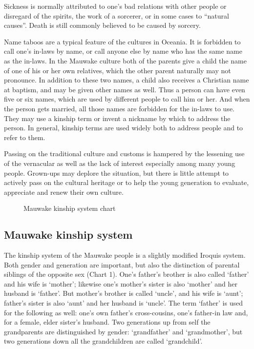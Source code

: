 Sickness is normally attributed to one's bad relations with other people or disregard of the spirits, the work of a sorcerer, or in some cases to ``natural causes''. Death is still commonly believed to be caused by sorcery.

Name taboos are a typical feature of the cultures in Oceania.  It is forbidden to call one's in-laws by name, or call anyone else by name who has the same name as the in-laws.  In the Mauwake culture both of the parents give a child the name of one of his or her own relatives, which the other parent naturally may not pronounce.  In addition to these two names, a child also receives a Christian name at baptism, and may be given other names as well.  Thus a person can have even five or six names, which are used by different people to call him or her.  And when the person gets married, all those names are forbidden for the in-laws to use.  They may use a kinship term or invent a nickname by which to address the person. In general, kinship terms are used widely both to address people and to refer to them.

Passing on the traditional culture and customs is hampered by the lessening use of the vernacular as well as the lack of interest especially among many young people. Grown-ups may deplore the situation, but there is little attempt to actively pass on the cultural heritage or to help the young generation to evaluate, appreciate and renew their own culture. 



\begin{figure}

\caption{Mauwake kinship system chart}
\label{fig:1:kinship}
\end{figure}
 



\subsection{Mauwake kinship system} \label{sec:1.3.6}
The kinship system of the Mauwake people is a slightly modified Iroquis system. Both gender and generation are important, but also the distinction of parental siblings of the opposite sex (Chart 1). One's father's brother is also called  `father' and his wife is  `mother'; likewise one's mother's sister is also `mother' and her husband is `father'. But mother's brother is called  `uncle', and his wife is  `aunt'; father's sister is also `aunt' and her husband is `uncle'. The term `father' is used for the following as well: one's own father's cross-cousins, one's father-in law and, for a female, elder sister's husband. Two generations up from self the grandparents are distinguished by gender:  `grandfather' and  `grandmother', but two generations down all the grandchildren are called  `grandchild'. 

